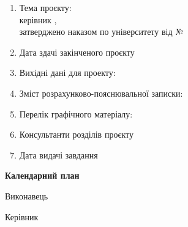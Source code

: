 \begin{enumerate}[itemsep=10pt, labelindent=0pt]
\item Тема проєкту: {\thesisTitle} \\
керівник {\supervisorFio, \supervisorRegalia} \\
затверджено наказом по університету від \approvalDate{} №~\approvalNum

\item Дата здачі закінченого проєкту \underline{\completeDate}

\item Вихідні дані для проекту: \dataInput

\item Зміст розрахунково-пояснювальної записки: \explanatoryNoteContents
\item Перелік графічного матеріалу: {\graphicMaterial}

\item Консультанти розділів проєкту

\consultantsTab

\item Дата видачі завдання \underline{\taskDate}
\end{enumerate}


\vspace{.5cm}

\begin{center}%
\textbf{Календарний план}
\end{center}


\calendarPlan  %


Виконавець \; \underline{\hspace{0.15\textwidth}} \; \thesisAuthor

\vspace{8mm}

Керівник \; \underline{\hspace{0.15\textwidth}} \; \supervisorFio

\newpage

%
%
%



